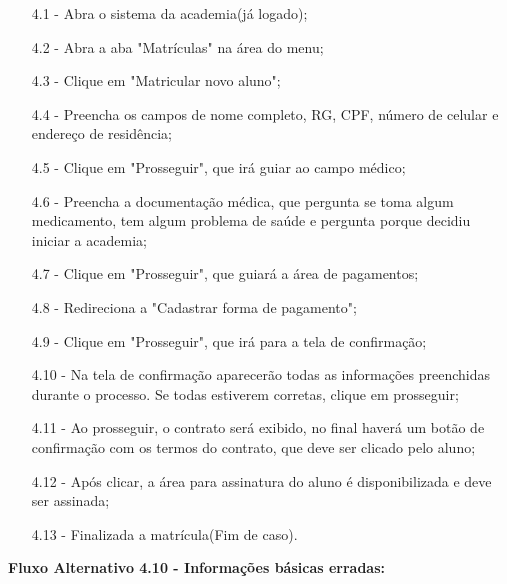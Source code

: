 \documentclass{article}
\begin{document}
    \begin{itemize}
        \item[4.1 -] Abra o sistema da academia(já logado);
        
        \item[4.2 -] Abra a aba "Matrículas" na área do menu;
        
        \item[4.3 -] Clique em "Matricular novo aluno";
        
        \item[4.4 -] Preencha os campos de nome completo, RG, CPF, número de celular e endereço de residência;
        
        \item[4.5 -] Clique em "Prosseguir", que irá guiar ao campo médico;
        
        \item[4.6 -] Preencha a documentação médica, que pergunta se toma algum medicamento, tem algum problema de saúde e pergunta porque decidiu iniciar a academia;
        
        \item[4.7 -] Clique em "Prosseguir", que guiará a área de pagamentos;
        
        \item[4.8 -] Redireciona a "Cadastrar forma de pagamento";
        
        \item[4.9 -] Clique em "Prosseguir", que irá para a tela de confirmação;
        
        \item[4.10 -] Na tela de confirmação aparecerão todas as informações preenchidas durante o processo. Se todas estiverem corretas, clique em prosseguir;
        
        \item[4.11 -] Ao prosseguir, o contrato será exibido, no final haverá um botão de confirmação com os termos do contrato, que deve ser clicado pelo aluno;
        
        \item[4.12 -] Após clicar, a área para assinatura do aluno é disponibilizada e deve ser assinada;
        
        \item[4.13 -] Finalizada a matrícula(Fim de caso).
    \end{itemize}

    \textbf{Fluxo Alternativo 4.10 - Informações básicas erradas:}
\end{document}
